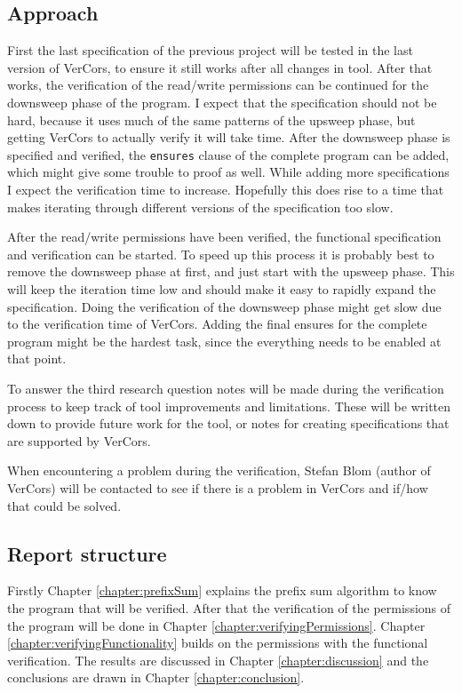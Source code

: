\documentclass[a4paper]{article}
\newcommand{\code}[1]{\texttt{\small \color{inline}#1}} %
\begin{document}
\subsection{Approach}
First the last specification of the previous project will be tested in the last version of VerCors, to ensure it still works after all changes in tool. After that works, the verification of the read/write permissions can be continued for the downsweep phase of the program. I expect that the specification should not be hard, because it uses much of the same patterns of the upsweep phase, but getting VerCors to actually verify it will take time. After the downsweep phase is specified and verified, the \code{ensures} clause of the complete program can be added, which might give some trouble to proof as well. While adding more specifications I expect the verification time to increase. Hopefully this does rise to a time that makes iterating through different versions of the specification too slow.

After the read/write permissions have been verified, the functional specification and verification can be started. To speed up this process it is probably best to remove the downsweep phase at first, and just start with the upsweep phase. This will keep the iteration time low and should make it easy to rapidly expand the specification. Doing the verification of the downsweep phase might get slow due to the verification time of VerCors. Adding the final ensures for the complete program might be the hardest task, since the everything needs to be enabled at that point.

To answer the third research question notes will be made during the verification process to keep track of tool improvements and limitations. These will be written down to provide future work for the tool, or notes for creating specifications that are supported by VerCors.

When encountering a problem during the verification, Stefan Blom (author of VerCors) will be contacted to see if there is a problem in VerCors and if/how that could be solved.

\subsection{Report structure}
Firstly Chapter \ref{chapter:prefixSum} explains the prefix sum algorithm to know the program that will be verified. After that the verification of the permissions of the program will be done in Chapter \ref{chapter:verifyingPermissions}. Chapter \ref{chapter:verifyingFunctionality} builds on the permissions with the functional verification. The results are discussed in Chapter \ref{chapter:discussion} and the conclusions are drawn in Chapter \ref{chapter:conclusion}.
\end{document}
